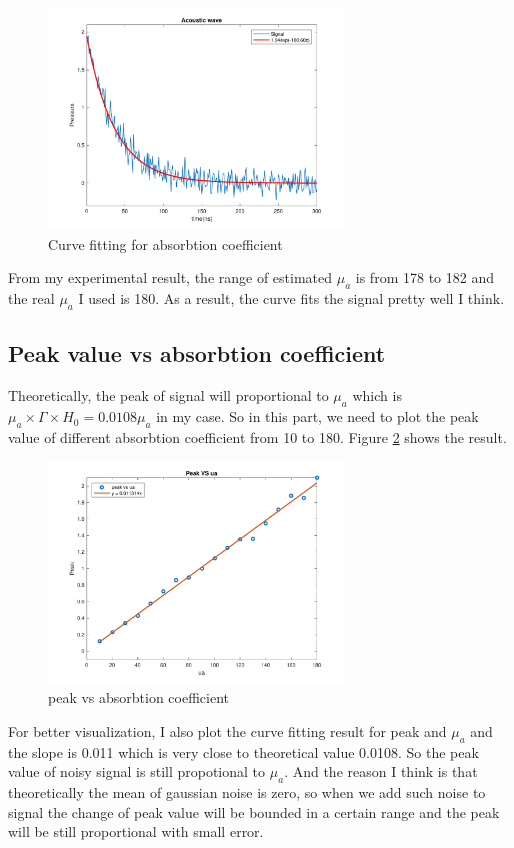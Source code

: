 \documentclass{article}
\begin{document}
\begin{figure}[H]
    \centering
    \includegraphics[width=0.7\textwidth]{src/p1c.pdf}
    \caption{Curve fitting for absorbtion coefficient}
    \label{fig:p1c}
\end{figure}

From my experimental result, the range of estimated $\mu_a$ is from 178 to 182 and the real $\mu_a$ I used is 180. 
As a result, the curve fits the signal pretty well I think.


\subsection{Peak value vs absorbtion coefficient}
\label{sec:p1d}
Theoretically, the peak of signal will proportional to $\mu_a$ which is $\mu_a \times \Gamma \times H_0 = 0.0108\mu_a$ in my case. 
So in this part, we need to plot the peak value of different absorbtion coefficient from 10 to 180. Figure \ref{fig:p1d} 
shows the result.
\begin{figure}[H]
    \centering
    \includegraphics[width=0.7\textwidth]{src/p1d.pdf}
    \caption{peak vs absorbtion coefficient}
    \label{fig:p1d}
\end{figure}
For better visualization, I also plot the curve fitting result for peak and $\mu_a$ and the slope is 0.011 which is very close to
theoretical value 0.0108. So the peak value of noisy signal is still propotional to $\mu_a$. And the reason I think is that
theoretically the mean of gaussian noise is zero, so when we add such noise to signal the change of peak value will be bounded
in a certain range and the peak will be still proportional with small error.
\end{document}
